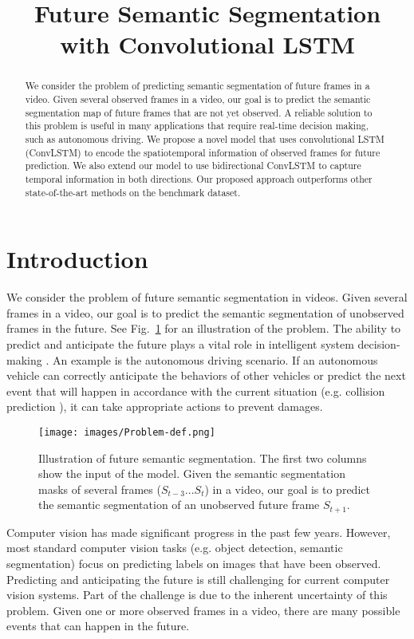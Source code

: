 \documentclass{bmvc2k}
\title{Future Semantic Segmentation with Convolutional LSTM}
\begin{document}
\maketitle
\begin{abstract}
  We consider the problem of predicting semantic segmentation of future frames in a video. Given several observed frames in a video, our goal is to predict the semantic segmentation map of future frames that are not yet observed. A reliable solution to this problem is useful in many applications that require real-time decision making, such as autonomous driving. We propose a novel model that uses convolutional LSTM (ConvLSTM) to encode the spatiotemporal information of observed frames for future prediction. We also extend our model to use bidirectional ConvLSTM to capture temporal information in both directions. Our proposed approach outperforms other state-of-the-art methods on the benchmark dataset.
\end{abstract}
\section{Introduction}\label{sec:intro}%

We consider the problem of future semantic segmentation in videos. Given several frames in a video, our goal is to predict the semantic segmentation of unobserved frames in the future. See Fig.~\ref{fig:problem} for an illustration of the problem. The ability to predict and anticipate the future plays a vital role in intelligent system decision-making \cite{sutton1998reinforcement,dosovitskiy2016learning}. An example is the autonomous driving scenario. If an autonomous vehicle can correctly anticipate the behaviors of other vehicles \cite{galceran2015multipolicy} or predict the next event that will happen in accordance with the current situation (e.g. collision prediction \cite{atev2005vision}), it can take appropriate actions to prevent damages.

\begin{figure}[t]
\begin{center}
  \texttt{[image: images/Problem-def.png]}
\end{center}
   \caption{Illustration of future semantic segmentation. The first two columns show the input of the model. Given the semantic segmentation masks of several frames ($S_{t-3}...S_{t}$) in a video, our goal is to predict the semantic segmentation of an unobserved future frame $S_{t+1}$. }
\label{fig:problem}
\end{figure}%
Computer vision has made significant progress in the past few years. However, most standard computer vision tasks (e.g. object detection, semantic segmentation) focus on predicting labels on images that have been observed.  Predicting and anticipating the future is still challenging for current computer vision systems. Part of the challenge is due to the inherent uncertainty of this problem. Given one or more observed frames in a video, there are many possible events that can happen in the future. 
\end{document}
